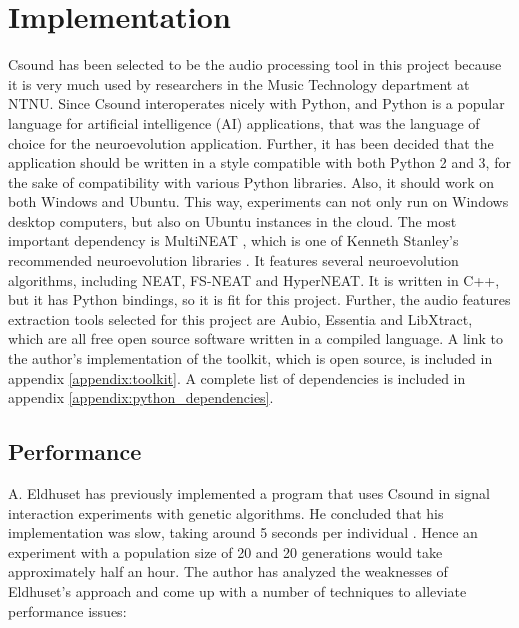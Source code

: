 \section{Implementation}
Csound has been selected to be the audio processing tool in this project because it is very much used by researchers in the Music Technology department at NTNU. Since Csound interoperates nicely with Python, and Python is a popular language for artificial intelligence (AI) applications, that was the language of choice for the neuroevolution application. Further, it has been decided that the application should be written in a style compatible with both Python 2 and 3, for the sake of compatibility with various Python libraries. Also, it should work on both Windows and Ubuntu. This way, experiments can not only run on Windows desktop computers, but also on Ubuntu instances in the cloud. The most important dependency is MultiNEAT \citep{multineat}, which is one of Kenneth Stanley’s recommended neuroevolution libraries \citep{neatsoftware}. It features several neuroevolution algorithms, including NEAT, FS-NEAT and HyperNEAT. It is written in C++, but it has Python bindings, so it is fit for this project. Further, the audio features extraction tools selected for this project are Aubio, Essentia and LibXtract, which are all free open source software written in a compiled language. A link to the author’s implementation of the toolkit, which is open source, is included in appendix \ref{appendix:toolkit}. A complete list of dependencies is included in appendix \ref{appendix:python_dependencies}.

\subsection{Performance}
A. Eldhuset has previously implemented a program that uses Csound in signal interaction experiments with genetic algorithms. He concluded that his implementation was slow, taking around 5 seconds per individual \citep{eldhuset2015}. Hence an experiment with a population size of 20 and 20 generations would take approximately half an hour. The author has analyzed the weaknesses of Eldhuset's approach and come up with a number of techniques to alleviate performance issues:

